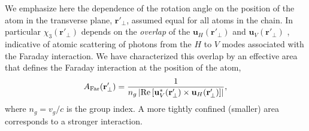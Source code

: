\documentclass[preprint,aps,pra,onecolumn,superscriptaddress]{revtex4-1} %
\newcommand{\mbf}[1]{\mathbf{#1}}
\newcommand{\AF}{A_{\rm Far}} %
\begin{document}
We emphasize here the dependence of the rotation angle on the position of the atom in the transverse plane, $\mbf{r}'_\perp$, assumed equal for all atoms in the chain.  In particular $\chi_3(\mbf{r}'_\perp)$ depends on the {\em overlap} of the $\mbf{u}_H (\mbf{r}'_\perp)$ and $\mbf{u}_V (\mbf{r}'_\perp)$ , indicative of atomic scattering of photons from the $H$ to $V$ modes associated with the Faraday interaction.  We have characterized this overlap by an effective area that defines the Faraday interaction at the position of the atom,
\begin{equation}
\AF(\mbf{r}'_\perp) = \frac{1}{n_g \left\vert \text{Re} \left[ \mbf{u}^*_V (\mbf{r}'_\perp) \times \mbf{u}_H (\mbf{r}'_\perp) \right]\right\vert},
\end{equation}
where $n_g = v_g/c$ is the group index.  A more tightly confined (smaller) area corresponds to a stronger interaction.
\end{document}
